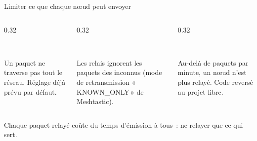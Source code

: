 \begin{frame}{Limiter ce que chaque nœud peut envoyer}
  \vspace{0.18cm}
  \begin{columns}[T]
    \begin{column}{0.32\textwidth}
      \begin{carte}[height=2.45cm,valign=top,colback=insarose!45]
        \raggedright{}\\[1pt]
        {\footnotesize Un paquet ne traverse pas tout le réseau. Réglage déjà prévu par défaut.\par}
      \end{carte}
    \end{column}
    \begin{column}{0.32\textwidth}
      \begin{carte}[height=2.45cm,valign=top,colback=insarose!45]
        \raggedright{}\\[1pt]
        {\footnotesize Les relais ignorent les paquets des inconnus (mode de retransmission «\,KNOWN\_ONLY\,» de Meshtastic).\par}
      \end{carte}
    \end{column}
    \begin{column}{0.32\textwidth}
      \begin{carte}[height=2.45cm,valign=top,colback=insarose!45]
        \raggedright{}\\[1pt]
        {\footnotesize Au-delà de \bravide{} paquets par minute, un nœud n'est plus relayé. Code reversé au projet libre.\par}
      \end{carte}
    \end{column}
  \end{columns}
  \vspace{0.15cm}
  \begin{pcompact}\centering\footnotesize
    Chaque paquet relayé coûte du temps d'émission à tous~: ne relayer que ce qui sert.
  \end{pcompact}
\end{frame}

